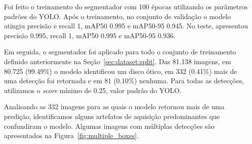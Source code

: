 \documentclass[12pt]{article}
\begin{document}
Foi feito o treinamento do segmentador com 100 épocas utilizando os parâmetros padrões do YOLO. Após o treinamento, no conjunto de validação o modelo atingiu precisão e recall 1, mAP50 0.995 e mAP50-95 0.945. No teste, apresentou precisão 0.995, recall 1, mAP50 0.995 e mAP50-95 0.936.


Em seguida, o segmentador foi aplicado para todo o conjunto de treinamento definido anteriormente na Seção~\ref{sec:dataset:split}. Das 81.138 imagens, em 80.725 (99.49\%) o modelo identificou um disco ótico, em 332 (0.41\%) mais de uma detecção foi retornada e em 81 (0.10\%) nenhuma. Para todas as detecções, utilizamos o \emph{score} mínimo de 0.25, valor padrão do YOLO.

Analisando as 332 imagens para as quais o modelo retornou mais de uma predição, identificamos alguns artefatos de aquisição predominantes que confundiram o modelo. Algumas imagens com múltiplas detecções são apresentados na Figura~\ref{fig:multiple_boxes}.
\end{document}
